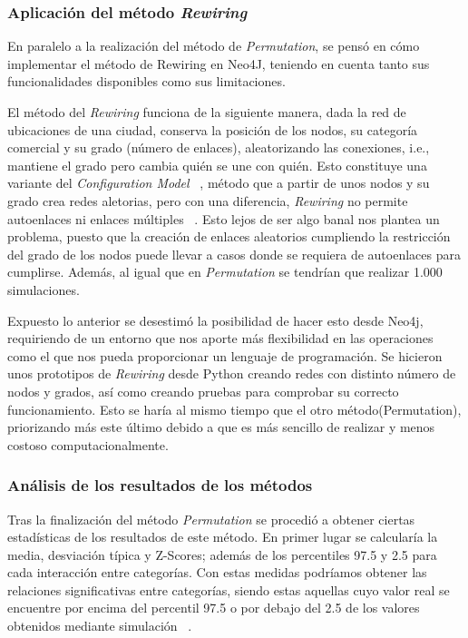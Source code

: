 \subsubsection{Aplicación del método \textit{Rewiring}}
En paralelo a la realización del método de \textit{Permutation}, se pensó en cómo implementar el método de Rewiring en Neo4J, teniendo en cuenta tanto sus funcionalidades disponibles como sus limitaciones.

El método del \textit{Rewiring} funciona de la siguiente manera, dada la red de ubicaciones de una ciudad, conserva la posición de los nodos, su categoría comercial y su grado (número de enlaces), aleatorizando las conexiones, i.e., mantiene el grado pero cambia quién se une con quién. Esto constituye una variante del \textit{Configuration Model} ~\cite{enwiki:1097175572}, método que a partir de unos nodos y su grado crea redes aletorias, pero con una diferencia, \textit{Rewiring} no permite autoenlaces ni enlaces múltiples ~\cite{RSVAJSSHJG}. Esto lejos de ser algo banal nos plantea un problema, puesto que la creación de enlaces aleatorios cumpliendo la restricción del grado de los nodos puede llevar a casos donde se requiera de autoenlaces para cumplirse. Además, al igual que en \textit{Permutation} se tendrían que realizar 1.000 simulaciones.

Expuesto lo anterior se desestimó la posibilidad de hacer esto desde Neo4j, requiriendo de un entorno que nos aporte más flexibilidad en las operaciones como el que nos pueda proporcionar un lenguaje de programación. Se hicieron unos prototipos de \textit{Rewiring} desde Python creando redes con distinto número de nodos y grados, así como creando pruebas para comprobar su correcto funcionamiento. Esto se haría al mismo tiempo que el otro método(Permutation), priorizando más este último debido a que es más sencillo de realizar y menos costoso computacionalmente.


\subsubsection{Análisis de los resultados de los métodos}
Tras la finalización del método \textit{Permutation} se procedió a obtener ciertas estadísticas de los resultados de este método. En primer lugar se calcularía la media, desviación típica y Z-Scores; además de los percentiles 97.5 y 2.5 para cada interacción entre categorías. Con estas medidas podríamos obtener las relaciones significativas entre categorías, siendo estas aquellas cuyo valor real se encuentre por encima del percentil 97.5 o por debajo del 2.5 de los valores obtenidos mediante simulación ~\cite{Ahedo2021}.

